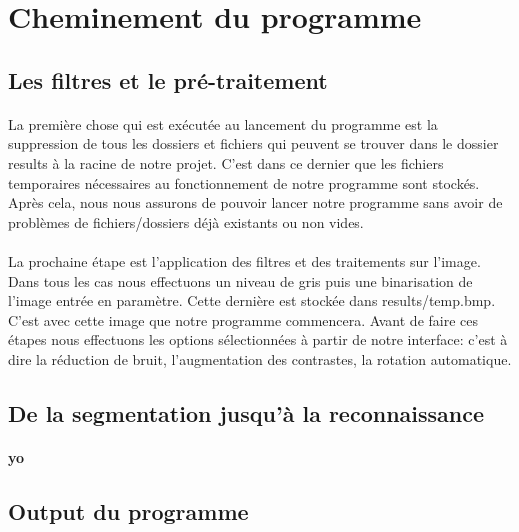 \documentclass{article}
\begin{document}
\newpage
{}
\section{Cheminement du programme}

\subsection{Les filtres et le pré-traitement}

\paragraph{}La première chose qui est exécutée au lancement du programme est la suppression de tous les dossiers et fichiers qui peuvent se trouver dans le dossier results à la racine de notre projet. C'est dans ce dernier que les fichiers temporaires nécessaires au fonctionnement de notre programme sont stockés. Après cela, nous nous assurons de pouvoir lancer notre programme sans avoir de problèmes de fichiers/dossiers déjà existants ou non vides.

\paragraph{}La prochaine étape est l'application des filtres et des traitements sur l'image. Dans tous les cas nous effectuons un niveau de gris puis une binarisation de l'image entrée en paramètre. Cette dernière est stockée dans results/temp.bmp. C'est avec cette image que notre programme commencera. Avant de faire ces étapes nous effectuons les options sélectionnées à partir de notre interface: c'est à dire la réduction de bruit, l'augmentation des contrastes, la rotation automatique.

\subsection{De la segmentation jusqu'à la reconnaissance}

\paragraph{yo}

\subsection{Output du programme}
\end{document}
